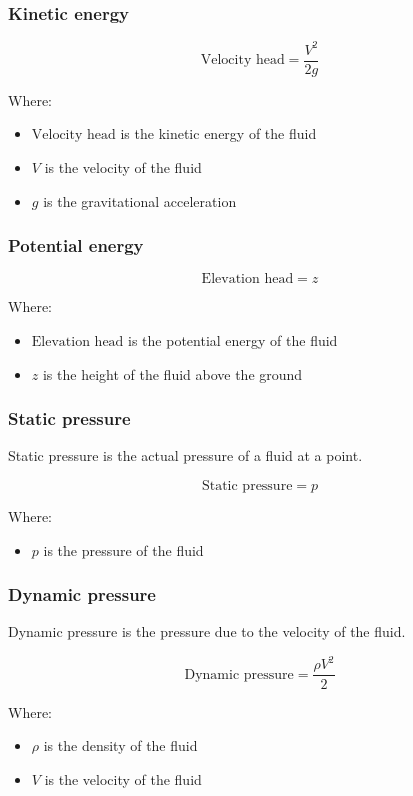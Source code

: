 \documentclass[11pt]{article}
\begin{document}
\subsubsection{Kinetic energy}
\label{sec:org0e721ed}
\[\text{Velocity head} = \frac{V^2}{2g}\]

Where:
\begin{itemize}
\item \(\text{Velocity head}\) is the kinetic energy of the fluid
\item \(V\) is the velocity of the fluid
\item \(g\) is the gravitational acceleration
\end{itemize}

\subsubsection{Potential energy}
\label{sec:orgacae024}
\[\text{Elevation head} = z\]

Where:
\begin{itemize}
\item \(\text{Elevation head}\) is the potential energy of the fluid
\item \(z\) is the height of the fluid above the ground
\end{itemize}

\subsubsection{Static pressure}
\label{sec:orga2648aa}
Static pressure is the actual pressure of a fluid at a point.

\[\text{Static pressure} = p\]

Where:
\begin{itemize}
\item \(p\) is the pressure of the fluid
\end{itemize}

\subsubsection{Dynamic pressure}
\label{sec:org94e44e8}
Dynamic pressure is the pressure due to the velocity of the fluid.

\[\text{Dynamic pressure} = \frac{\rho V^2}{2}\]

Where:
\begin{itemize}
\item \(\rho\) is the density of the fluid
\item \(V\) is the velocity of the fluid
\end{itemize}
\end{document}
